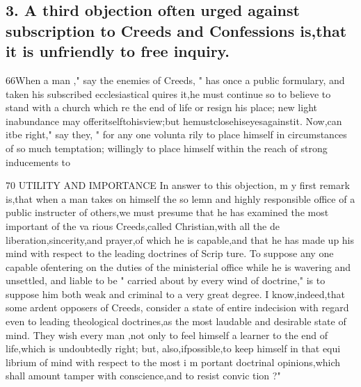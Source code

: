 \documentclass[
]{book}
\begin{document}
\hypertarget{a-third-objection-often-urged-against-subscription-to-creeds-and-confessions-isthat-it-is-unfriendly-to-free-inquiry.}{%
\subsection{3. A third objection often urged against subscription to Creeds and Confessions is,that it is unfriendly to free inquiry.}\label{a-third-objection-often-urged-against-subscription-to-creeds-and-confessions-isthat-it-is-unfriendly-to-free-inquiry.}}

66When a man ," say the enemies of Creeds, " has once
a public formulary, and taken his
subscribed
ecclesiastical
quires it,he must continue so to believe to
stand with a church which re
the end of life or resign his place; new light inabundance may offeritselftohisview;but hemustclosehiseyesagainstit. Now,can
itbe right," say they, " for any one volunta
rily to place himself in circumstances
of so
much temptation; willingly to place himself within the reach of strong inducements to

70 UTILITY AND IMPORTANCE
In answer to this objection, m y first remark
is,that when a man takes on himself the so
lemn and highly responsible office of a public
instructer of others,we must presume that he
has examined the most important of the va
rious Creeds,called Christian,with all the de
liberation,sincerity,and prayer,of which he
is capable,and that he has made up his mind
with respect to the leading doctrines of Scrip
ture. To suppose any one capable ofentering on the duties of the ministerial office while he
is wavering and unsettled, and liable to be
" carried about by every wind of doctrine," is to suppose him both weak and criminal to a
very great degree. I know,indeed,that some ardent opposers of Creeds, consider a state of entire indecision with regard even to leading theological doctrines,as the most laudable and desirable state of mind. They wish every man ,not only to feel himself a learner to the end of life,which is undoubtedly right; but,
also,ifpossible,to keep himself in that equi librium of mind with respect to the most i m
portant doctrinal opinions,which shall amount
tamper with conscience,and to resist convic tion ?"
\end{document}
